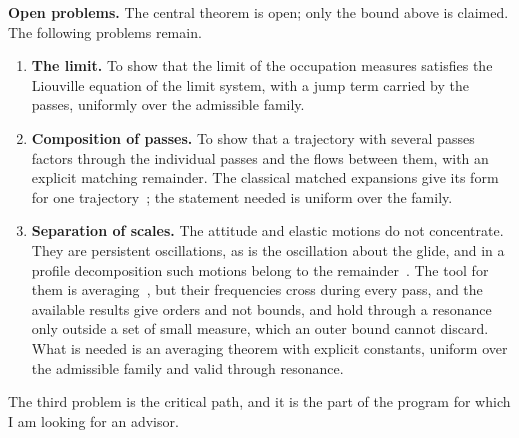 \documentclass[english,10pt]{extarticle}
\newcommand{\head}[1]{\par\smallskip\noindent\textbf{#1}\enspace}
\begin{document}
\head{Open problems.}
The central theorem is open; only the bound above is claimed. The following
problems remain.
\begin{enumerate}[leftmargin=1.6em,itemsep=0pt,topsep=2pt]
  \item \textbf{The limit.} To show that the limit of the occupation
    measures satisfies the Liouville equation of the limit system, with a
    jump term carried by the passes, uniformly over the admissible family.
  \item \textbf{Composition of passes.} To show that a trajectory with
    several passes factors through the individual passes and the flows
    between them, with an explicit matching remainder. The classical
    matched expansions give its form for one
    trajectory~\cite{shi1971skip}; the statement needed is uniform over the
    family.
  \item \textbf{Separation of scales.} The attitude and elastic motions do
    not concentrate. They are persistent oscillations, as is the
    oscillation about the glide, and in a profile decomposition such
    motions belong to the remainder~\cite{bahouri1999high}. The tool for
    them is averaging~\cite{sanders2007averaging}, but their frequencies
    cross during every pass, and the available results give orders and not
    bounds, and hold through a resonance only outside a set of small
    measure, which an outer bound cannot discard. What is needed is an
    averaging theorem with explicit constants, uniform over the admissible
    family and valid through resonance.
\end{enumerate}
The third problem is the critical path, and it is the part of the program
for which I am looking for an advisor.

\printbibliography[heading=none]
\end{document}
